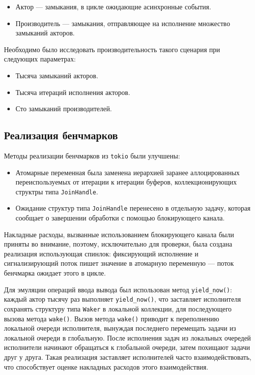 \begin{itemize}
    \item Актор --- замыкания, в цикле ожидающие асинхронные события.
    \item Производитель --- замыкания, отправляющее на исполнение множество замыканий акторов.
\end{itemize}

Необходимо было исследовать производительность такого сценария при следующих параметрах:

\begin{itemize}
    \item Тысяча замыканий акторов.
    \item Тысяча итераций исполнения акторов.
    \item Сто замыканий производителей.
\end{itemize}

\subsection{Реализация бенчмарков}

Методы реализации бенчмарков из \verb|tokio| были улучшены:

\begin{itemize}
    \item Атомарные переменная была заменена иерархией заранее аллоцированных переиспользуемых от итерации к итерации буферов, коллекционирующих структры типа \verb|JoinHandle|.
    \item Ожидание структур типа \verb|JoinHandle| перенесено в отдельную задачу, которая сообщает о завершении обработки с помощью блокирующего канала.
\end{itemize}

Накладные расходы, вызванные использованием блокирующего канала были приняты во внимание, поэтому, исключительно для проверки, была создана реализация использующая спинлок: фиксирующий исполнение и сигнализирующий поток пишет значение в атомарную переменную --- поток бенчмарка ожидает этого в цикле.

Для эмуляции операций ввода вывода был использован метод \verb|yield_now()|: каждый актор тысячу раз выполняет \verb|yield_now()|, что заставляет исполнителя сохранять структуру типа \verb|Waker| в локальной коллекции, для последующего вызова метода \verb|wake()|. Вызов метода \verb|wake()| приводит к переполнению локальной очереди исполнителя, вынуждая последнего перемещать задачи из локальной очереди в глобальную. После исполнения задач из локальных очередей исполнители начинают обращаться к глобальной очереди, затем похищают задачи друг у друга. Такая реализация заставляет исполнителей часто взаимодействовать, что способствует оценке накладных расходов этого взаимодействия.
